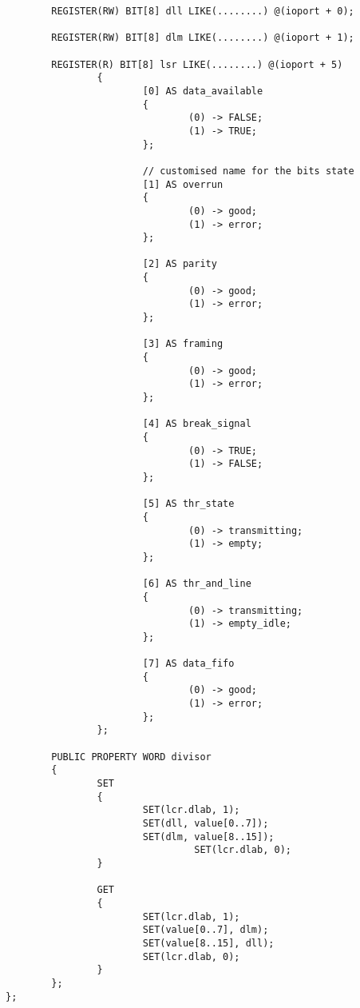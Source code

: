 \documentclass[american]{rtxreport}
\begin{document}
\begin{lstlisting}
        REGISTER(RW) BIT[8] dll LIKE(........) @(ioport + 0);

        REGISTER(RW) BIT[8] dlm LIKE(........) @(ioport + 1);

        REGISTER(R) BIT[8] lsr LIKE(........) @(ioport + 5)
                {
                        [0] AS data_available
                        {
                                (0) -> FALSE;
                                (1) -> TRUE;
                        };

                        // customised name for the bits state
                        [1] AS overrun
                        {
                                (0) -> good;
                                (1) -> error;
                        };

                        [2] AS parity
                        {
                                (0) -> good;
                                (1) -> error;
                        };

                        [3] AS framing
                        {
                                (0) -> good;
                                (1) -> error;
                        };

                        [4] AS break_signal
                        {
                                (0) -> TRUE;
                                (1) -> FALSE;
                        };

                        [5] AS thr_state
                        {
                                (0) -> transmitting;
                                (1) -> empty;
                        };

                        [6] AS thr_and_line
                        {
                                (0) -> transmitting;
                                (1) -> empty_idle;
                        };

                        [7] AS data_fifo
                        {
                                (0) -> good;
                                (1) -> error;
                        };
                };

        PUBLIC PROPERTY WORD divisor
        {
                SET
                {
                        SET(lcr.dlab, 1);
                        SET(dll, value[0..7]);
                        SET(dlm, value[8..15]);
                                 SET(lcr.dlab, 0);
                }

                GET
                {
                        SET(lcr.dlab, 1);
                        SET(value[0..7], dlm);
                        SET(value[8..15], dll);
                        SET(lcr.dlab, 0);
                }
        };
};


\end{lstlisting}
\end{document}
